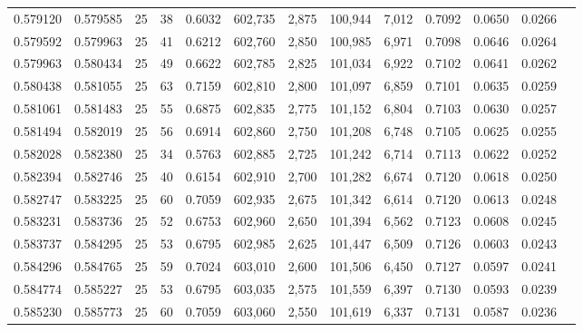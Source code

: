 \begin{tabular}{rrrrrrrrrrrrr}
0.579120 & 0.579585 &    25 &  38 &                                     0.6032 & 602,735 &   2,875 & 100,944 &   7,012 & 0.7092 & 0.0650 & 0.0266 \\
0.579592 & 0.579963 &    25 &  41 &                                     0.6212 & 602,760 &   2,850 & 100,985 &   6,971 & 0.7098 & 0.0646 & 0.0264 \\
0.579963 & 0.580434 &    25 &  49 &                                     0.6622 & 602,785 &   2,825 & 101,034 &   6,922 & 0.7102 & 0.0641 & 0.0262 \\
0.580438 & 0.581055 &    25 &  63 &                                     0.7159 & 602,810 &   2,800 & 101,097 &   6,859 & 0.7101 & 0.0635 & 0.0259 \\
0.581061 & 0.581483 &    25 &  55 &                                     0.6875 & 602,835 &   2,775 & 101,152 &   6,804 & 0.7103 & 0.0630 & 0.0257 \\
0.581494 & 0.582019 &    25 &  56 &                                     0.6914 & 602,860 &   2,750 & 101,208 &   6,748 & 0.7105 & 0.0625 & 0.0255 \\
0.582028 & 0.582380 &    25 &  34 &                                     0.5763 & 602,885 &   2,725 & 101,242 &   6,714 & 0.7113 & 0.0622 & 0.0252 \\
0.582394 & 0.582746 &    25 &  40 &                                     0.6154 & 602,910 &   2,700 & 101,282 &   6,674 & 0.7120 & 0.0618 & 0.0250 \\
0.582747 & 0.583225 &    25 &  60 &                                     0.7059 & 602,935 &   2,675 & 101,342 &   6,614 & 0.7120 & 0.0613 & 0.0248 \\
0.583231 & 0.583736 &    25 &  52 &                                     0.6753 & 602,960 &   2,650 & 101,394 &   6,562 & 0.7123 & 0.0608 & 0.0245 \\
0.583737 & 0.584295 &    25 &  53 &                                     0.6795 & 602,985 &   2,625 & 101,447 &   6,509 & 0.7126 & 0.0603 & 0.0243 \\
0.584296 & 0.584765 &    25 &  59 &                                     0.7024 & 603,010 &   2,600 & 101,506 &   6,450 & 0.7127 & 0.0597 & 0.0241 \\
0.584774 & 0.585227 &    25 &  53 &                                     0.6795 & 603,035 &   2,575 & 101,559 &   6,397 & 0.7130 & 0.0593 & 0.0239 \\
0.585230 & 0.585773 &    25 &  60 &                                     0.7059 & 603,060 &   2,550 & 101,619 &   6,337 & 0.7131 & 0.0587 & 0.0236 \\

\end{tabular}
